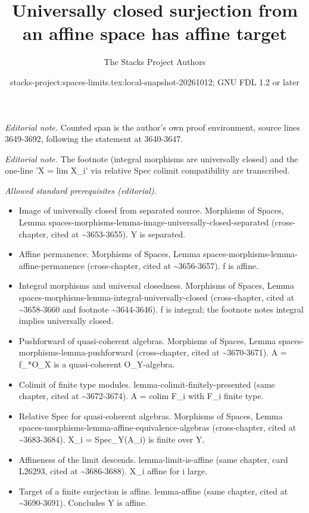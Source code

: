 \documentclass{stacks-project}
\title{Universally closed surjection from an affine space has affine target}
\author{The Stacks Project Authors}
\date{stacks-project:spaces-limits.tex:local-snapshot-20261012; GNU FDL 1.2 or later}
\theoremstyle{plain}
\theoremstyle{definition}
\theoremstyle{remark}
\numberwithin{equation}{subsection}
\begin{document}
\maketitle
\noindent\textit{Editorial note.} Counted span is the author's own proof environment, source lines 3649-3692, following the statement at 3640-3647.\par\medskip
\noindent\textit{Editorial note.} The footnote (integral morphisms are universally closed) and the one-line 'X = lim X\_i' via relative Spec colimit compatibility are transcribed.\par\medskip
\noindent\textit{Allowed standard prerequisites (editorial).}\begin{itemize}
\item Image of universally closed from separated source. Morphisms of Spaces, Lemma spaces-morphisms-lemma-image-universally-closed-separated (cross-chapter, cited at \textasciitilde{}3653-3655). Y is separated.
\item Affine permanence. Morphisms of Spaces, Lemma spaces-morphisms-lemma-affine-permanence (cross-chapter, cited at \textasciitilde{}3656-3657). f is affine.
\item Integral morphisms and universal closedness. Morphisms of Spaces, Lemma spaces-morphisms-lemma-integral-universally-closed (cross-chapter, cited at \textasciitilde{}3658-3660 and footnote \textasciitilde{}3644-3646). f is integral; the footnote notes integral implies universally closed.
\item Pushforward of quasi-coherent algebras. Morphisms of Spaces, Lemma spaces-morphisms-lemma-pushforward (cross-chapter, cited at \textasciitilde{}3670-3671). A = f\_*O\_X is a quasi-coherent O\_Y-algebra.
\item Colimit of finite type modules. lemma-colimit-finitely-presented (same chapter, cited at \textasciitilde{}3672-3674). A = colim F\_i with F\_i finite type.
\item Relative Spec for quasi-coherent algebras. Morphisms of Spaces, Lemma spaces-morphisms-lemma-affine-equivalence-algebras (cross-chapter, cited at \textasciitilde{}3683-3684). X\_i = Spec\_Y(A\_i) is finite over Y.
\item Affineness of the limit descends. lemma-limit-is-affine (same chapter, card L26293, cited at \textasciitilde{}3686-3688). X\_i affine for i large.
\item Target of a finite surjection is affine. lemma-affine (same chapter, cited at \textasciitilde{}3690-3691). Concludes Y is affine.
\end{itemize}\medskip
\end{document}
